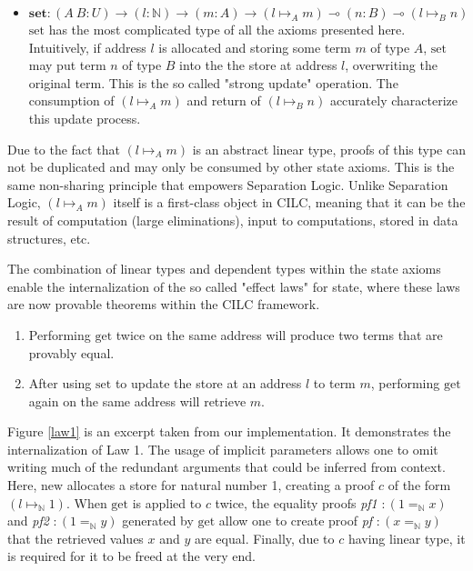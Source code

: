 \documentclass[sigplan,screen,review,authordraft]{acmart}
\newcommand{\new}{\text{new}}
\newcommand{\get}{\text{get}}
\newcommand{\set}{\text{set}}
\begin{document}
\begin{definition}
\begin{itemize}
    \item $\textbf{set} : (A\ B : U) \rightarrow (l : \mathbb{N}) \rightarrow (m : A) \rightarrow (l \mapsto_A m) \multimap (n : B) \multimap (l \mapsto_B n)$ \\
          $\set$ has the most complicated type of all the axioms presented here. Intuitively, if address $l$ is allocated and storing some term $m$ of type $A$, $\set$ may put term $n$ of type $B$ into the the store at address $l$, overwriting the original term. This is the so called "strong update" operation. The consumption of $(l \mapsto_A m)$ and return of $(l \mapsto_B n)$ accurately characterize this update process.
  \end{itemize}
\end{definition}
Due to the fact that $(l \mapsto_A m)$ is an abstract linear type, proofs of this type can not be duplicated and may only be consumed by other state axioms. This is the same non-sharing principle that empowers Separation Logic. Unlike Separation Logic, $(l \mapsto_A m)$ itself is a first-class object in CILC, meaning that it can be the result of computation (large eliminations), input to computations, stored in data structures, etc.

The combination of linear types and dependent types within the state axioms enable the internalization of the so called "effect laws" for state, where these laws are now provable theorems within the CILC framework.

\begin{enumerate}
  \item Performing $\get$ twice on the same address will produce two terms that are provably equal.
  \item After using $\set$ to update the store at an address $l$ to term $m$, performing $\get$ again on the same address will retrieve $m$.
\end{enumerate}

Figure \ref{law1} is an excerpt taken from our implementation. It demonstrates the internalization of Law 1. The usage of implicit parameters allows one to omit writing much of the redundant arguments that could be inferred from context. Here, $\new$ allocates a store for natural number 1, creating a proof $c$ of the form $(l \mapsto_\mathbb{N} 1)$. When $\get$ is applied to $c$ twice, the equality proofs \textit{pf1} $: (1 =_\mathbb{N} x)$ and \textit{pf2} $: (1 =_\mathbb{N} y)$ generated by $\get$ allow one to create proof \textit{pf} $: (x =_\mathbb{N} y)$ that the retrieved values $x$ and $y$ are equal. Finally, due to $c$ having linear type, it is required for it to be freed at the very end.
\end{document}

